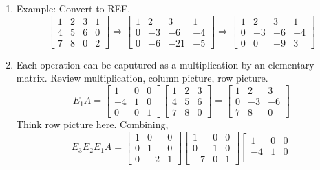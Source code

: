 \documentclass{article}
\theoremstyle{remark}
\begin{document}
\begin{enumerate}
\begin{enumerate}
\item Example: Convert to REF.  
\[
\left[\begin{array}{ccc|c}  
 1 & 2 & 3 & 1\\  
 4 & 5 & 6 & 0 \\
 7 & 8 & 0 & 2
\end{array}\right]
\Rightarrow
\left[\begin{array}{ccc|c}  
 1 & 2 & 3 & 1\\  
 0 & -3 & -6 & -4 \\
 0 & -6 & -21 & -5
\end{array}\right]
\Rightarrow
\left[\begin{array}{ccc|c}  
 1 & 2 & 3 & 1\\  
 0 & -3 & -6 & -4 \\
 0 & 0 & -9 & 3
\end{array}\right]
\]
\item Each operation can be caputured as a multiplication by an elementary matrix. Review multiplication, column picture, row picture.
\[
E_1A = 
\left[\begin{array}{ccc}  
 1 & 0 & 0 \\  
 -4 & 1 & 0  \\
 0 & 0 & 1
\end{array}\right]
\left[\begin{array}{ccc}  
 1 & 2 & 3 \\  
 4 & 5 & 6  \\
 7 & 8 & 0 
\end{array}\right]
= 
\left[\begin{array}{ccc}  
 1 & 2 & 3 \\  
 0 & -3 & -6  \\
 7 & 8 & 0 
\end{array}\right]
\]
Think row picture here. Combining, 
\[
E_3 E_2 E_1 A = 
\left[\begin{array}{ccc}  
 1 & 0 & 0 \\  
 0 & 1 & 0  \\
 0 & -2 & 1 
\end{array}\right]
\left[\begin{array}{ccc}  
 1 & 0 & 0 \\  
 0 & 1 & 0  \\
 -7 & 0 & 1 
\end{array}\right]
\left[\begin{array}{ccc}  
 1 & 0 & 0 \\  
 -4 & 1 & 0  \\

\end{array}\]
\end{enumerate}
\end{enumerate}
\end{document}

